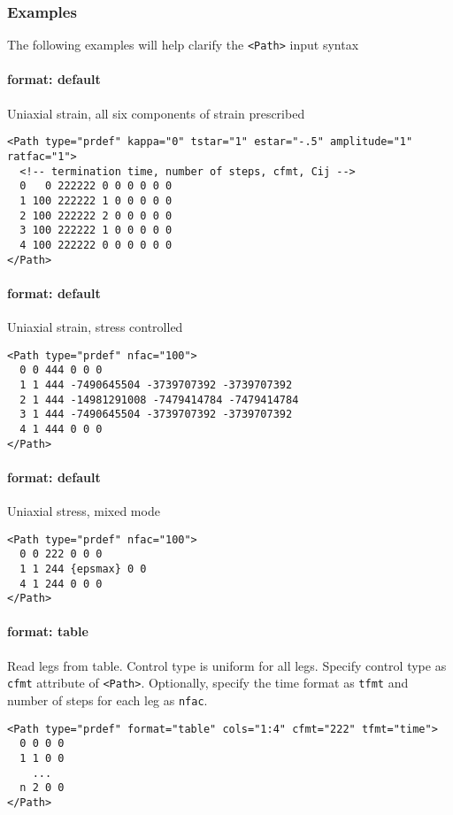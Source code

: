 \documentclass[11pt]{report}
\newcommand{\tag}[1]{\texttt{<#1>}}
\begin{document}
\subsubsection{Examples}
The following examples will help clarify the \tag{Path} input syntax

\paragraph{format: default} Uniaxial strain, all six components of strain prescribed
\begin{verbatim}
<Path type="prdef" kappa="0" tstar="1" estar="-.5" amplitude="1" ratfac="1">
  <!-- termination time, number of steps, cfmt, Cij -->
  0   0 222222 0 0 0 0 0 0
  1 100 222222 1 0 0 0 0 0
  2 100 222222 2 0 0 0 0 0
  3 100 222222 1 0 0 0 0 0
  4 100 222222 0 0 0 0 0 0
</Path>
\end{verbatim}

\paragraph{format: default} Uniaxial strain, stress controlled
\begin{verbatim}
<Path type="prdef" nfac="100">
  0 0 444 0 0 0
  1 1 444 -7490645504 -3739707392 -3739707392
  2 1 444 -14981291008 -7479414784 -7479414784
  3 1 444 -7490645504 -3739707392 -3739707392
  4 1 444 0 0 0
</Path>
\end{verbatim}

\paragraph{format: default} Uniaxial stress, mixed mode
\begin{verbatim}
<Path type="prdef" nfac="100">
  0 0 222 0 0 0
  1 1 244 {epsmax} 0 0
  4 1 244 0 0 0
</Path>
\end{verbatim}

\paragraph{format: table} Read legs from table. Control type is uniform for all
legs. Specify control type as \texttt{cfmt} attribute of \tag{Path}.
Optionally, specify the time format as \texttt{tfmt} and number of steps for
each leg as \texttt{nfac}.
\begin{verbatim}
<Path type="prdef" format="table" cols="1:4" cfmt="222" tfmt="time">
  0 0 0 0
  1 1 0 0
    ...
  n 2 0 0
</Path>
\end{verbatim}
\end{document}
